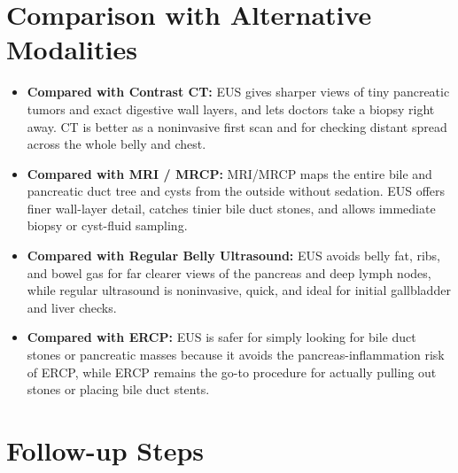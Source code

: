 \section{Comparison with Alternative Modalities}

\begin{itemize}
    \item \textbf{Compared with Contrast CT:} EUS gives sharper views of tiny pancreatic tumors and exact digestive wall layers, and lets doctors take a biopsy right away. CT is better as a noninvasive first scan and for checking distant spread across the whole belly and chest.
    \item \textbf{Compared with MRI / MRCP:} MRI/MRCP maps the entire bile and pancreatic duct tree and cysts from the outside without sedation. EUS offers finer wall-layer detail, catches tinier bile duct stones, and allows immediate biopsy or cyst-fluid sampling.
    \item \textbf{Compared with Regular Belly Ultrasound:} EUS avoids belly fat, ribs, and bowel gas for far clearer views of the pancreas and deep lymph nodes, while regular ultrasound is noninvasive, quick, and ideal for initial gallbladder and liver checks.
    \item \textbf{Compared with ERCP:} EUS is safer for simply looking for bile duct stones or pancreatic masses because it avoids the pancreas-inflammation risk of ERCP, while ERCP remains the go-to procedure for actually pulling out stones or placing bile duct stents.
\end{itemize}

\section{Follow-up Steps}

